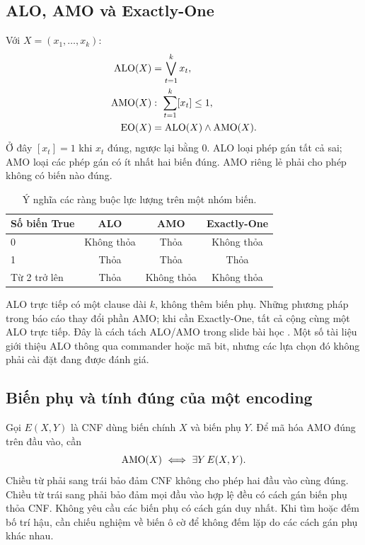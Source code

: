 \subsection{ALO, AMO và Exactly-One}
Với $X=(x_1,\ldots,x_k)$:
\begin{align}
\operatorname{ALO}(X)&=\bigvee_{t=1}^{k}x_t,\\
\operatorname{AMO}(X)&:\ \sum_{t=1}^{k}[x_t]\le1,\\
\operatorname{EO}(X)&=\operatorname{ALO}(X)\land\operatorname{AMO}(X).
\label{eq:eo}
\end{align}
Ở đây $[x_t]=1$ khi $x_t$ đúng, ngược lại bằng 0. ALO loại phép gán tất cả sai; AMO loại các phép gán có ít nhất hai biến đúng. AMO riêng lẻ phải cho phép không có biến nào đúng.

\begin{table}[pos=H]\centering\small
\caption{Ý nghĩa các ràng buộc lực lượng trên một nhóm biến.}
\begin{tabular}{@{}lccc@{}}\toprule
Số biến True & ALO & AMO & Exactly-One\\\midrule
0 & Không thỏa & Thỏa & Không thỏa\\
1 & Thỏa & Thỏa & Thỏa\\
Từ 2 trở lên & Thỏa & Không thỏa & Không thỏa\\
\bottomrule\end{tabular}
\end{table}

ALO trực tiếp có một clause dài $k$, không thêm biến phụ. Những phương pháp trong báo cáo thay đổi phần AMO; khi cần Exactly-One, tất cả cộng cùng một ALO trực tiếp. Đây là cách tách ALO/AMO trong slide bài học \citep{amoSlides}. Một số tài liệu giới thiệu ALO thông qua commander hoặc mã bit, nhưng các lựa chọn đó không phải cài đặt đang được đánh giá.

\subsection{Biến phụ và tính đúng của một encoding}
Gọi $E(X,Y)$ là CNF dùng biến chính $X$ và biến phụ $Y$. Để mã hóa AMO đúng trên đầu vào, cần
\begin{equation}
\operatorname{AMO}(X)\ \Longleftrightarrow\ \exists Y\,E(X,Y).
\label{eq:existential}
\end{equation}
Chiều từ phải sang trái bảo đảm CNF không cho phép hai đầu vào cùng đúng. Chiều từ trái sang phải bảo đảm mọi đầu vào hợp lệ đều có cách gán biến phụ thỏa CNF. Không yêu cầu các biến phụ có cách gán duy nhất. Khi tìm hoặc đếm bố trí hậu, cần chiếu nghiệm về biến ô cờ để không đếm lặp do các cách gán phụ khác nhau.

